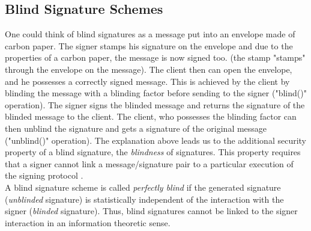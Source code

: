 \subsection{Blind Signature Schemes}
\label{sec:blind-sign-schemes}
\label{sec:blind-sign-perfect-blindness}
One could think of blind signatures as a message put into an envelope made of carbon paper. The signer stamps his signature on the envelope and due to the properties of a carbon paper, the message is now signed too. (the stamp "stamps" through the envelope on the message).
The client then can open the envelope, and he possesses a correctly signed message.
This is achieved by the client by blinding the message with a blinding factor before sending to the signer ("blind()" operation).
The signer signs the blinded message and returns the signature of the blinded message to the client.
The client, who possesses the blinding factor can then unblind the signature and gets a signature of the original message ("unblind()" operation).
The explanation above leads us to the additional security property of a blind signature, the \textit{blindness} of signatures.
This property requires that a signer cannot link a message/signature pair to a particular execution of the signing protocol \cite{cryptoeprint:2019:877}.\\
A blind signature scheme is called \textit{perfectly blind} if the generated signature (\textit{unblinded} signature) is statistically independent of the interaction with the signer (\textit{blinded} signature).
Thus, blind signatures cannot be linked to the signer interaction in an information theoretic sense. \cite{schnorr:perfect-dl-signatures} \cite{spring:wallet-db-with-observers}
